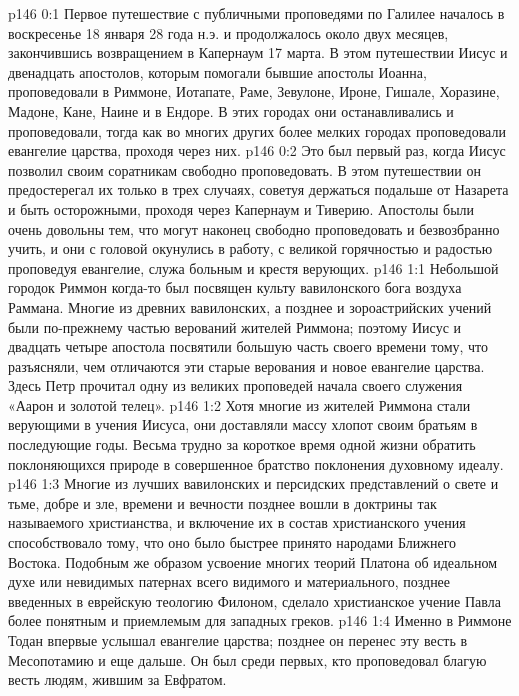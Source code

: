 \author{Комиссия срединников}
\vs p146 0:1 Первое путешествие с публичными проповедями по Галилее началось в воскресенье 18 января 28 года н.э. и продолжалось около двух месяцев, закончившись возвращением в Капернаум 17 марта. В этом путешествии Иисус и двенадцать апостолов, которым помогали бывшие апостолы Иоанна, проповедовали в Риммоне, Иотапате, Раме, Зевулоне, Ироне, Гишале, Хоразине, Мадоне, Кане, Наине и в Ендоре. В этих городах они останавливались и проповедовали, тогда как во многих других более мелких городах проповедовали евангелие царства, проходя через них.
\vs p146 0:2 Это был первый раз, когда Иисус позволил своим соратникам свободно проповедовать. В этом путешествии он предостерегал их только в трех случаях, советуя держаться подальше от Назарета и быть осторожными, проходя через Капернаум и Тиверию. Апостолы были очень довольны тем, что могут наконец свободно проповедовать и безвозбранно учить, и они с головой окунулись в работу, с великой горячностью и радостью проповедуя евангелие, служа больным и крестя верующих.
\vs p146 1:1 Небольшой городок Риммон когда\hyp{}то был посвящен культу вавилонского бога воздуха Раммана. Многие из древних вавилонских, а позднее и зороастрийских учений были по\hyp{}прежнему частью верований жителей Риммона; поэтому Иисус и двадцать четыре апостола посвятили большую часть своего времени тому, что разъясняли, чем отличаются эти старые верования и новое евангелие царства. Здесь Петр прочитал одну из великих проповедей начала своего служения «Аарон и золотой телец».
\vs p146 1:2 Хотя многие из жителей Риммона стали верующими в учения Иисуса, они доставляли массу хлопот своим братьям в последующие годы. Весьма трудно за короткое время одной жизни обратить поклоняющихся природе в совершенное братство поклонения духовному идеалу.
\vs p146 1:3 \pc Многие из лучших вавилонских и персидских представлений о свете и тьме, добре и зле, времени и вечности позднее вошли в доктрины так называемого христианства, и включение их в состав христианского учения способствовало тому, что оно было быстрее принято народами Ближнего Востока. Подобным же образом усвоение многих теорий Платона об идеальном духе или невидимых патернах всего видимого и материального, позднее введенных в еврейскую теологию Филоном, сделало христианское учение Павла более понятным и приемлемым для западных греков.
\vs p146 1:4 \pc Именно в Риммоне Тодан впервые услышал евангелие царства; позднее он перенес эту весть в Месопотамию и еще дальше. Он был среди первых, кто проповедовал благую весть людям, жившим за Евфратом.
